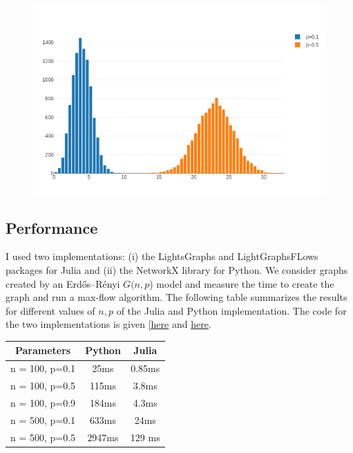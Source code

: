 \begin{figure}[H]
\centering
\includegraphics[scale=0.55]{images/max_flow_04_08.png}
\end{figure}


\subsection{Performance}

I used two implementations: (i) the LightsGraphs and LightGraphsFLows packages for Julia and (ii) the NetworkX library for Python. We consider graphs created by an Erdős–Rényi $G(n,p$) model and measure the time to create the graph and run a max-flow algorithm. The following table summarizes the results for different values of $n, p$ of the Julia and Python implementation. The code for the two implementations is given \href{https://github.com/ClemensFMN/JuliaStuff/blob/master/Graphs/rand_graph_perf.jl}{[here} and \href{https://github.com/ClemensFMN/PythonStuff/blob/master/graphs/max_flow_rand_graph.py}{here}.

\vspace{2mm}

\begin{tabular}{|c|c|c|} \hline
  Parameters & Python & Julia \\ \hline
  n = 100, p=0.1 & 25ms & 0.85ms \\
  n = 100, p=0.5 & 115ms & 3.8ms \\
  n = 100, p=0.9 & 184ms & 4.3ms \\
  n = 500, p=0.1 & 633ms & 24ms \\
  n = 500, p=0.5 & 2947ms &129 ms \\ \hline
\end{tabular}

